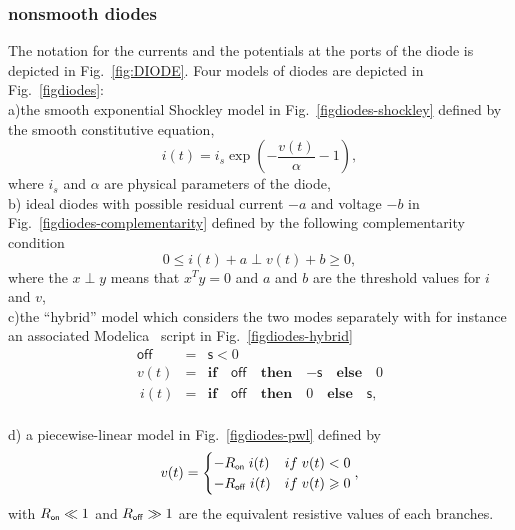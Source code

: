\subsubsection{nonsmooth  diodes}  The notation for the currents and the potentials at the ports of the diode is depicted in Fig.~\ref{fig:DIODE}. Four models of diodes are depicted in Fig.~\ref{figdiodes}:\\
a)the smooth exponential Shockley model in Fig.~\ref{figdiodes-shockley} defined by the smooth constitutive equation,
  \begin{equation}
    \label{eq:diode-shockley}
     i(t) = i_s \exp(- \frac{v(t)}{\alpha} - 1),
  \end{equation}
where $i_s$ and $\alpha$ are physical parameters of the diode,\\
b) ideal diodes with possible residual current $-a$ and voltage $-b$ in Fig.~\ref{figdiodes-complementarity} defined by the following complementarity condition
  \begin{equation}
    \label{eq:diode-complementarity}
     0\leq i(t)+a \perp v(t)+b \geq 0 ,
  \end{equation}
where the $x \perp y $ means that $x^T y =0$ and $a$ and $b$ are the threshold values for $i$ and $v$,\\
c)the ``hybrid'' model which considers the two modes separately with for instance  an associated Modelica~\cite{elmqvist2001} script in Fig.~\ref{figdiodes-hybrid}
  \begin{equation}
    \label{eq:diode-hybrid}
    \begin{array}{cll}
          \mathsf{off} &=& \mathsf{s} < 0 \\
          v(t)  &=& \mathbf{if}\quad \mathsf{off} \quad \mathbf{then}\quad \mathsf{-s} \quad \mathbf{else} \quad 0 \\
          \ i(t) &=& \mathbf{if}\quad \mathsf{off} \quad
          \mathbf{then}\quad 0  \quad \mathbf{else}\quad \mathsf{s},
        \end{array} 
  \end{equation}\\
d) a piecewise-linear model in Fig.~\ref{figdiodes-pwl} defined by
  \begin{equation}
    \label{eq:diode-pwl}
    v(t)=\begin{cases}-R_\on\; i(t) & \mbox{if}\;v(t) < 0 \\   -R_\off\; i(t) & \mbox{if}\;v(t) \geq  0 \\ \end{cases},
  \end{equation}
with $R_\on \ll 1 $ and $ R_\off \gg 1 $ are the  equivalent resistive values of each branches.

